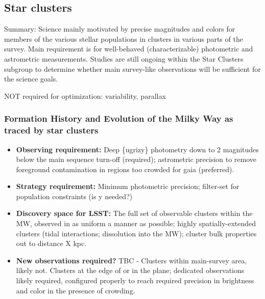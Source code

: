 \subsection{Star clusters}

Summary: Science mainly motivated by precise magnitudes and colors for
members of the various stellar populations in clusters in various
parts of the survey. Main requirement is for well-behaved
(characterizable) photometric and astrometric measurements. Studies
are still ongoing within the Star Clusters subgroup to determine
whether main survey-like observations will be sufficient for the science
goals.

NOT required for optimization: variability, parallax



\subsubsection{Formation History and Evolution of the Milky Way as traced by star clusters}
\vspace{-2mm}
\begin{itemize}
\item {\bf Observing requirement:} Deep \{ugrizy\} photometry down to 2 magnitudes below the main sequence turn-off (required); astrometric precision to remove foreground contamination in regions too crowded for gaia (preferred).
\vspace{-2mm}

\item {\bf Strategy requirement:} Minimum photometric precision; filter-set for population constraints (is y needed?)
\vspace{-2mm}

\item {\bf Discovery space for LSST:} The full set of observable clusters within the MW, observed in as uniform a manner as possible; highly spatially-extended clusters (tidal interactions; dissolution into the MW); cluster bulk properties out to distance X kpc.
\vspace{-2mm}

\item {\bf New observations required?} TBC - Clusters within main-survey area, likely not. Clusters at the edge of or in the plane; dedicated observations likely required, configured properly to reach required precision in brightness and color in the presence of crowding.
\vspace{-2mm}
\end{itemize}


